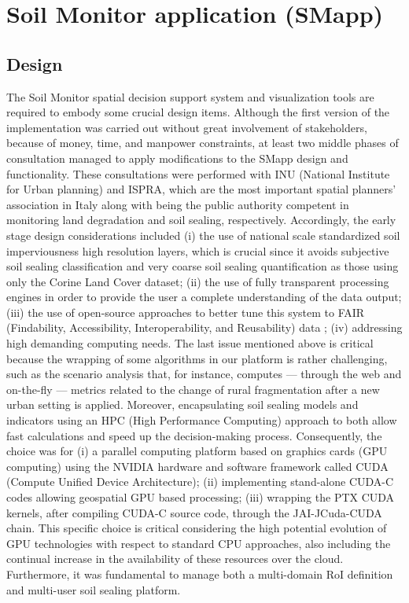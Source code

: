 \documentclass[APA,LATO1COL,doublespace]{WileyNJD-v2}
\begin{document}
\section{Soil Monitor application (SMapp)}
\subsection{Design}
The Soil Monitor spatial decision support system and visualization tools are required to embody some crucial design items. Although the first version of the implementation was carried out without great involvement of stakeholders, because of money, time, and manpower constraints, at least two middle phases of consultation managed to apply modifications to the SMapp design and functionality. These consultations were performed with INU (National Institute for Urban planning) and ISPRA, which are the most important spatial planners’ association in Italy along with being the public authority competent in monitoring land degradation and soil sealing, respectively.
Accordingly, the early stage design considerations included (i) the use of national scale standardized soil imperviousness high resolution layers, which is crucial since it avoids subjective soil sealing classification and very coarse soil sealing quantification as those using only the Corine Land Cover dataset; (ii) the use of fully transparent processing engines in order to provide the user a complete understanding of the data output; (iii) the use of open-source approaches to better tune this system to FAIR (Findability, Accessibility, Interoperability, and Reusability) data ; (iv) addressing high demanding computing needs.
The last issue mentioned above is critical because the wrapping of some algorithms in our platform is rather challenging, such as the scenario analysis that, for instance, computes — through the web and on-the-fly — metrics related to the change of rural fragmentation after a new urban setting is applied. Moreover, encapsulating soil sealing models and indicators using an HPC (High Performance Computing) approach to both allow fast calculations and speed up the decision-making process. Consequently, the choice was for (i) a parallel computing platform based on graphics cards (GPU computing) using the NVIDIA hardware and software framework called CUDA (Compute Unified Device Architecture); (ii) implementing stand-alone CUDA-C codes allowing geospatial GPU based processing; (iii) wrapping the PTX CUDA kernels, after compiling CUDA-C source code, through the JAI-JCuda-CUDA chain. This specific choice is critical considering the high potential evolution of GPU technologies with respect to standard CPU approaches, also including the continual increase in the availability of these resources over the cloud. Furthermore, it was fundamental to manage both a multi-domain RoI definition and multi-user soil sealing platform.
\end{document}
